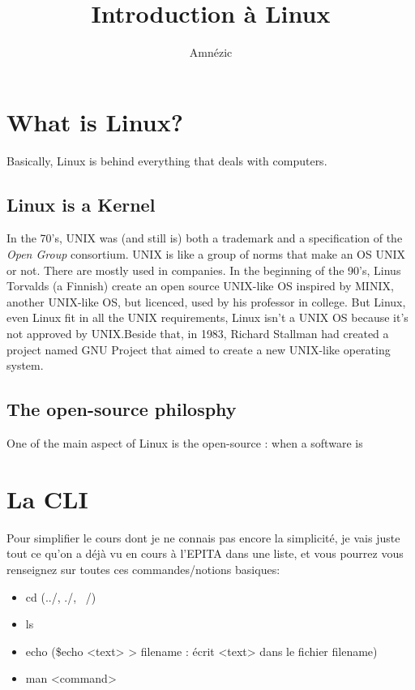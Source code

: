 \documentclass{article}
\author{Amnézic}
\date{}
\title{Introduction à Linux}
\begin{document}
\maketitle
\newpage
\tableofcontents
\newpage

\section{What is Linux?}
Basically, Linux is behind everything that deals with computers.
\subsection{Linux is \textbf{a} Kernel}
In the 70's, UNIX was (and still is) both a trademark and a specification of the \textit{Open Group} consortium. UNIX is like a group of norms that make an OS UNIX or not. There are mostly used in companies. In the beginning of the 90's, Linus Torvalds (a Finnish) create an open source UNIX-like OS inspired by MINIX, another UNIX-like OS, but licenced, used by his professor in college. But Linux, even Linux fit in all the UNIX requirements, Linux isn't a UNIX OS because it's not approved by UNIX.\newline Beside that, in 1983, Richard Stallman had created a project named GNU Project that aimed to create a new UNIX-like operating system.

\subsection{The open-source philosphy}
One of the main aspect of Linux is the open-source : when a software is 

\section{La CLI}
Pour simplifier le cours dont je ne connais pas encore la simplicité, je vais juste tout ce qu'on a déjà vu en cours à l'EPITA dans une liste, et vous pourrez vous renseignez sur toutes ces commandes/notions basiques:
\begin{itemize}
	\item cd (../, ./, ~/) 
	\item ls
	\item echo (\$echo <text> > filename : \rightarrow écrit <text> dans le fichier filename)
	\item man <command>
\end{itemize}
\end{document}
